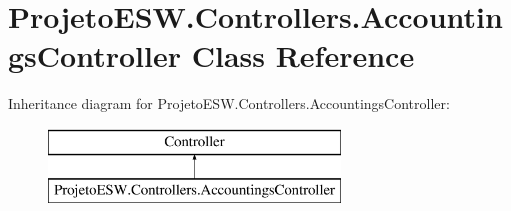 \hypertarget{class_projeto_e_s_w_1_1_controllers_1_1_accountings_controller}{}\section{Projeto\+E\+S\+W.\+Controllers.\+Accountings\+Controller Class Reference}
\label{class_projeto_e_s_w_1_1_controllers_1_1_accountings_controller}
Inheritance diagram for Projeto\+E\+S\+W.\+Controllers.\+Accountings\+Controller\+:\begin{figure}[H]
\begin{center}
\leavevmode
\includegraphics[height=2.000000cm]{class_projeto_e_s_w_1_1_controllers_1_1_accountings_controller}
\end{center}
\end{figure}
